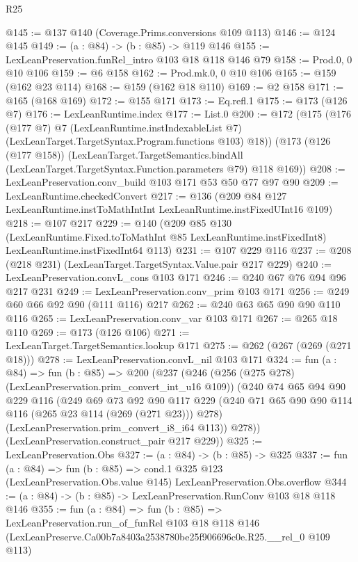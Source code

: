 \begin{lexlean}{R25}
\begin{coremodule}
@145 := @137 @140 (Coverage.Prims.conversions @109 @113)
@146 := @124 @145
@149 := (a : @84) -> (b : @85) -> @119 @146
@155 := LexLeanPreservation.funRel_intro @103 @18 @118 @146 @79
@158 := Prod.{0, 0} @10 @106
@159 := @6 @158
@162 := Prod.mk.{0, 0} @10 @106
@165 := @159 (@162 @23 @114)
@168 := @159 (@162 @18 @110)
@169 := @2 @158
@171 := @165 (@168 @169)
@172 := @155 @171
@173 := Eq.refl.{1}
@175 := @173 (@126 @7)
@176 := LexLeanRuntime.index
@177 := List.{0}
@200 := @172
    (@175
      (@176
        (@177 @7)
        @7
        (LexLeanRuntime.instIndexableList @7)
        (LexLeanTarget.TargetSyntax.Program.functions @103)
        @18))
    (@173
      (@126 (@177 @158))
      (LexLeanTarget.TargetSemantics.bindAll
        (LexLeanTarget.TargetSyntax.Function.parameters @79)
        @118
        @169))
@208 := LexLeanPreservation.conv_build @103 @171 @53 @50 @77 @97 @90
@209 := LexLeanRuntime.checkedConvert
@217 := @136 (@209 @84 @127 LexLeanRuntime.instToMathIntInt LexLeanRuntime.instFixedUInt16 @109)
@218 := @107 @217
@229 := @140
    (@209
      @85
      @130
      (LexLeanRuntime.Fixed.toToMathInt @85 LexLeanRuntime.instFixedInt8)
      LexLeanRuntime.instFixedInt64
      @113)
@231 := @107 @229 @116
@237 := @208 (@218 @231) (LexLeanTarget.TargetSyntax.Value.pair @217 @229)
@240 := LexLeanPreservation.convL_cons @103 @171
@246 := @240 @67 @76 @94 @96 @217 @231
@249 := LexLeanPreservation.conv_prim @103 @171
@256 := @249 @60 @66 @92 @90 (@111 @116) @217
@262 := @240 @63 @65 @90 @90 @110 @116
@265 := LexLeanPreservation.conv_var @103 @171
@267 := @265 @18 @110
@269 := @173 (@126 @106)
@271 := LexLeanTarget.TargetSemantics.lookup @171
@275 := @262 (@267 (@269 (@271 @18)))
@278 := LexLeanPreservation.convL_nil @103 @171
@324 := fun (a : @84) =>
  fun (b : @85) =>
  @200
    (@237
      (@246
        (@256 (@275 @278) (LexLeanPreservation.prim_convert_int_u16 @109))
        (@240
          @74
          @65
          @94
          @90
          @229
          @116
          (@249
            @69
            @73
            @92
            @90
            @117
            @229
            (@240 @71 @65 @90 @90 @114 @116 (@265 @23 @114 (@269 (@271 @23))) @278)
            (LexLeanPreservation.prim_convert_i8_i64 @113))
          @278))
      (LexLeanPreservation.construct_pair @217 @229))
@325 := LexLeanPreservation.Obs
@327 := (a : @84) -> (b : @85) -> @325
@337 := fun (a : @84) =>
  fun (b : @85) =>
  cond.{1} @325 @123 (LexLeanPreservation.Obs.value @145) LexLeanPreservation.Obs.overflow
@344 := (a : @84) -> (b : @85) -> LexLeanPreservation.RunConv @103 @18 @118 @146
@355 := fun (a : @84) =>
  fun (b : @85) =>
  LexLeanPreservation.run_of_funRel
    @103
    @18
    @118
    @146
    (LexLeanPreserve.Ca00b7a8403a2538780be25f906696c0e.R25.__rel_0 @109 @113)
\end{coremodule}
\end{lexlean}
